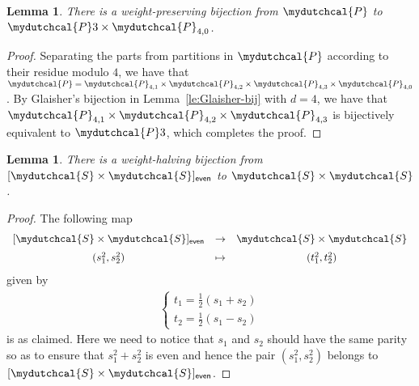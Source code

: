 \documentclass[12pt,reqno]{amsart}
\numberwithin{equation}{section}
\theoremstyle{plain}
\newtheorem{lemma}[theorem]{Lemma}
\theoremstyle{definition}
\theoremstyle{named}
\newcommand{\cP}{\mydutchcal{P}}
\newcommand{\cD}{\mydutchcal{D}}
\newcommand{\cS}{\mydutchcal{S}}
\newcommand{\even}{\mathsf{even}}
\begin{document}


\begin{lemma}\label{lemma:splitP}
	There is a weight-preserving bijection from $\cP$ to $\cP3 \times \cP_{4,0}$.
\end{lemma}

\begin{proof}
	Separating the parts from partitions in $\cP$ according to their residue modulo $4$, we have that $\cP = \cP_{4,1} \times \cP_{4,2} \times\cP_{4,3} \times\cP_{4,0}$. By Glaisher's bijection in Lemma~\ref{le:Glaisher-bij} with $d=4$, we have that $\cP_{4,1} \times \cP_{4,2} \times\cP_{4,3}$ is bijectively equivalent to $\cP3$, which completes the proof.
\end{proof}

\begin{lemma}\label{lemma:sstt}
	There is a weight-halving bijection from $[\cS\times \cS]_\even$ to $\cS\times \cS$.
\end{lemma}

\begin{proof}
	The following map
	\begin{align*}
		\begin{array}{ccc}
			[\cS\times \cS]_\even & \to & \cS\times \cS\\[6pt]
			(s_1^2,s_2^2) & \mapsto & (t_1^2,t_2^2)
		\end{array}
	\end{align*}
	given by
	\begin{align*}
		\begin{cases}
			t_1=\frac{1}{2}(s_1+s_2)\\
			t_2=\frac{1}{2}(s_1-s_2)
		\end{cases}
	\end{align*}
	is as claimed. Here we need to notice that $s_1$ and $s_2$ should have the same parity so as to ensure that $s_1^2+s_2^2$ is even and hence the pair $(s_1^2,s_2^2)$ belongs to $[\cS\times \cS]_\even$.
\end{proof}
\end{document}
